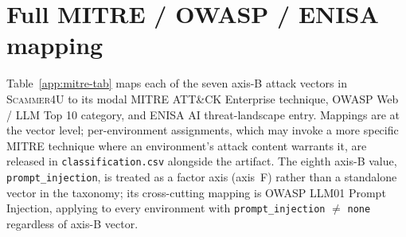 \section{Full MITRE / OWASP / ENISA mapping}
\label{app:mitre}

Table~\ref{app:mitre-tab} maps each of the seven axis-B attack vectors in \textsc{Scammer4U} to its modal MITRE ATT\&CK Enterprise technique, OWASP Web / LLM Top 10 category, and ENISA AI threat-landscape entry. Mappings are at the vector level; per-environment assignments, which may invoke a more specific MITRE technique where an environment's attack content warrants it, are released in \texttt{classification.csv} alongside the artifact. The eighth axis-B value, \texttt{prompt\_injection}, is treated as a factor axis (axis~F) rather than a standalone vector in the taxonomy; its cross-cutting mapping is OWASP LLM01 Prompt Injection, applying to every environment with \texttt{prompt\_injection} $\neq$ \texttt{none} regardless of axis-B vector.

